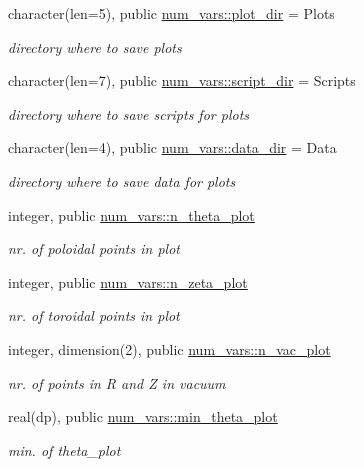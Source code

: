 \begin{DoxyCompactItemize}
character(len=5), public \hyperlink{namespacenum__vars_a63868c5912af08559dcdd2db31e68696}{num\+\_\+vars\+::plot\+\_\+dir} = \textquotesingle{}Plots\textquotesingle{}
\begin{DoxyCompactList}\small\item\em directory where to save plots \end{DoxyCompactList}\item 
character(len=7), public \hyperlink{namespacenum__vars_a2b5f419579cb2d0ac2adda364be58fb5}{num\+\_\+vars\+::script\+\_\+dir} = \textquotesingle{}Scripts\textquotesingle{}
\begin{DoxyCompactList}\small\item\em directory where to save scripts for plots \end{DoxyCompactList}\item 
character(len=4), public \hyperlink{namespacenum__vars_af48173a7062997585f7a7ca9363290b3}{num\+\_\+vars\+::data\+\_\+dir} = \textquotesingle{}Data\textquotesingle{}
\begin{DoxyCompactList}\small\item\em directory where to save data for plots \end{DoxyCompactList}\item 
integer, public \hyperlink{namespacenum__vars_a0c3d2a6eea73c4d47f30df016475b585}{num\+\_\+vars\+::n\+\_\+theta\+\_\+plot}
\begin{DoxyCompactList}\small\item\em nr. of poloidal points in plot \end{DoxyCompactList}\item 
integer, public \hyperlink{namespacenum__vars_a657b74ac497053e3c848796f1afaca5f}{num\+\_\+vars\+::n\+\_\+zeta\+\_\+plot}
\begin{DoxyCompactList}\small\item\em nr. of toroidal points in plot \end{DoxyCompactList}\item 
integer, dimension(2), public \hyperlink{namespacenum__vars_a5331aef164e788f0e3aa354ea8059a01}{num\+\_\+vars\+::n\+\_\+vac\+\_\+plot}
\begin{DoxyCompactList}\small\item\em nr. of points in R and Z in vacuum \end{DoxyCompactList}\item 
real(dp), public \hyperlink{namespacenum__vars_a2085f22558c1b4a349b5ad1b6abfe09f}{num\+\_\+vars\+::min\+\_\+theta\+\_\+plot}
\begin{DoxyCompactList}\small\item\em min. of {\ttfamily theta\+\_\+plot} \end{DoxyCompactList}\item 

\end{DoxyCompactItemize}
